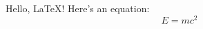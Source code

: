\documentclass{article}
\begin{document}
Hello, \LaTeX! Here’s an equation:
\[
E = mc^2
\]
\end{document}
